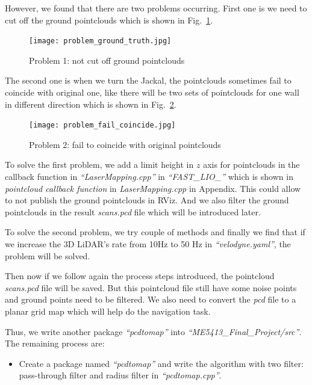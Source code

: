\documentclass[hyperref]{article}
\theoremstyle{nonumberplain}
\begin{document}
However, we found that there are two problems occurring. First one is we need to cut off the ground pointclouds which is shown in Fig.~\ref{fig2}.

\begin{figure}[H]
	\centering
	\texttt{[image: problem\_ground\_truth.jpg]}
	\caption{Problem 1: not cut off ground pointclouds}
	\label{fig2}
\end{figure}

The second one is when we turn the Jackal, the pointclouds sometimes fail to coincide with original one, like there will be two sets of pointclouds for one wall in different direction which is shown in Fig.~\ref{fig3}.

\begin{figure}[H]
	\centering
	\texttt{[image: problem\_fail\_coincide.jpg]}
	\caption{Problem 2: fail to coincide with original pointclouds}
	\label{fig3}
\end{figure}

To solve the first problem, we add a limit height in $z$ axis for pointclouds in the callback function in \textit{“LaserMapping.cpp”} in \textit{“FAST\_LIO\_”} which is shown in \textit{pointcloud callback function} in \textit{LaserMapping.cpp} in Appendix. This could allow to not publish the ground pointclouds in RViz. And we also filter the ground pointclouds in the result \textit{scans.pcd} file which will be introduced later.

To solve the second problem, we try couple of methods and finally we find that if we increase the 3D LiDAR’s rate from 10Hz to 50 Hz in \textit{“velodyne.yaml”}, the problem will be solved.

Then now if we follow again the process steps introduced, the pointcloud \textit{scans.pcd} file will be saved. But this pointcloud file still have some noise points and ground points need to be filtered. We also need to convert the \textit{pcd} file to a planar grid map which will help do the navigation task.

Thus, we write another package \textit{“pcdtomap”} into \textit{“ME5413\_Final\_Project/src”}. The remaining process are:

\begin{itemize}[itemsep=3pt,topsep=0pt,parsep=0pt]
	\item Create a package named \textit{“pcdtomap”} and write the algorithm with two filter: pass-through filter and radius filter in \textit{“pcdtomap.cpp”}.
\end{itemize}
\end{document}
